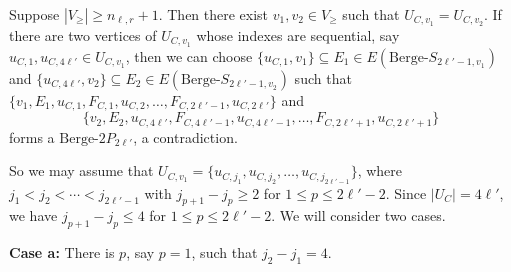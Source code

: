 \documentclass[12pt]{article}%
\newcommand{\ber}{\text{Berge-}}
\newcounter{cases}
\begin{document}
 Suppose  $|V_{\geq}|\geq n_{\ell,r}+1$. Then there exist $v_{1},v_{2}\in V_{\geq}$ such that $U_{C,v_1}=U_{C,v_2}$. If there are two vertices of $U_{C,v_1}$ whose indexes are sequential, say $u_{C,1},u_{C,4\ell'}\in U_{C,v_1}$, then we can choose $\{u_{C,1},v_1\}\subseteq E_{1}\in E(\ber S_{2\ell'-1,v_1})$ and $\{u_{C,4\ell'},v_2\}\subseteq E_{2}\in E(\ber S_{2\ell'-1,v_2})$ such that $\{v_1,E_1,u_{C,1},F_{C,1},u_{C,2}, \ldots,F_{C,2\ell'-1},u_{C,2\ell'}\}$ and $$\{v_2,E_2,u_{C,4\ell'},F_{C,4\ell'-1},u_{C,4\ell'-1},\ldots,F_{C,2\ell'+1}, u_{C,2\ell'+1}\}$$ forms a $\ber 2P_{2\ell'}$, a contradiction.

So we may assume that $U_{C,v_1}=\{u_{C,j_1},u_{C,j_2},\ldots,u_{C,j_{2\ell'-1}}\}$, where $j_1<j_2<\cdots<j_{2\ell'-1}$ with $j_{p+1}-j_{p}\ge 2$ for $1\le p\le 2\ell'-2$. Since $|U_C|=4\ell'$, we have $j_{p+1}-j_{p}\le 4$ for $1\le p\le 2\ell'-2$. We will consider two cases.
\par\noindent
\textbf{Case a: } There is $p$, say $p=1$, such that $j_2-j_1=4$.
\end{document}
